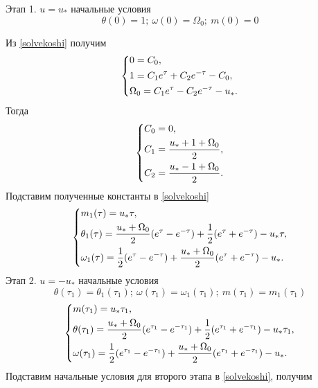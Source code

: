\documentclass[a4paper,14pt]{article}
\theoremstyle{plain} %
\theoremstyle{definition} %
\theoremstyle{remark} %
\begin{document}
{Этап 1. $u=u_*$ начальные условия
\[
    \theta(0)=1;\ \omega(0)=\Omega_0;\ m(0)=0
\]

Из \eqref{solvekoshi} получим
\begin{equation}\label{stage11}
    \left\{ {\begin{aligned}
                 & 0 = C_0, \hfill                                 \\
                 & 1 = C_1e^\tau+C_2e^{-\tau}-C_0 , \hfill         \\
                 & \Omega_0 = C_1e^\tau-C_2e^{-\tau}-u_*  . \hfill \\
            \end{aligned}} \right.
\end{equation}
Тогда
\begin{equation}\label{stage1Consts}
    \left\{ {\begin{aligned}
                 & C_0 = 0, \hfill                         \\
                 & C_1 = \frac{u_*+1+\Omega_0}{2}, \hfill  \\
                 & C_2 = \frac{u_*-1+\Omega_0}{2} . \hfill \\
            \end{aligned}} \right.
\end{equation}
Подставим полученные константы в \eqref{solvekoshi}
\begin{equation}\label{solvefull1stage}
    \left\{ {\begin{aligned}
                 & m_1(\tau) = u_*\tau, \hfill                                                                              \\
                 & \theta_1(\tau) = \frac{u_*+\Omega_0}{2}(e^\tau-e^{-\tau})+\frac{1}{2}(e^\tau+e^{-\tau})-u_*\tau , \hfill \\
                 & \omega_1(\tau) = \frac{1}{2}(e^\tau-e^{-\tau})+\frac{u_*+\Omega_0}{2}(e^\tau+e^{-\tau})-u_*  . \hfill    \\
            \end{aligned}} \right.
\end{equation}
Этап 2. $u=-u_*$ начальные условия
\[
    \theta(\tau_1)=\theta_1(\tau_1);\ \omega(\tau_1)=\omega_1(\tau_1);\ m(\tau_1)=m_1(\tau_1)
\]
\begin{equation}\label{basecond2stage}
    \left\{ {\begin{aligned}
                 & m(\tau_1) = u_*\tau_1, \hfill                                                                                          \\
                 & \theta(\tau_1) = \frac{u_*+\Omega_0}{2}(e^{\tau_1}-e^{-\tau_1})+\frac{1}{2}(e^{\tau_1}+e^{-\tau_1})-u_*\tau_1 , \hfill \\
                 & \omega(\tau_1) = \frac{1}{2}(e^{\tau_1}-e^{-\tau_1})+\frac{u_*+\Omega_0}{2}(e^{\tau_1}+e^{-\tau_1})-u_*  . \hfill      \\
            \end{aligned}} \right.
\end{equation}
Подставим начальные условия для второго этапа в \eqref{solvekoshi}, получим

}
\end{document}
